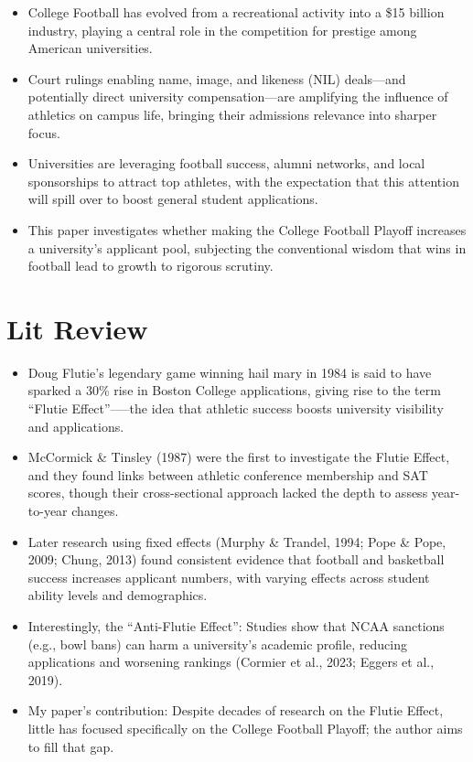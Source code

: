 \documentclass{article}
\begin{document}
\begin{itemize}
    \item College Football has evolved from a recreational activity into a \$15 billion industry, playing a central role in the competition for prestige among American universities.

    \item Court rulings enabling name, image, and likeness (NIL) deals---and potentially direct university compensation---are amplifying the influence of athletics on campus life, bringing their admissions relevance into sharper focus.

    \item Universities are leveraging football success, alumni networks, and local sponsorships to attract top athletes, with the expectation that this attention will spill over to boost general student applications.

    \item This paper investigates whether making the College Football Playoff increases a university's applicant pool, subjecting the conventional wisdom that wins in football lead to growth to rigorous scrutiny.
\end{itemize}

\section{Lit Review}

\begin{itemize}

    \item Doug Flutie’s legendary game winning hail mary in 1984 is said to have sparked a 30\% rise in Boston College applications, giving rise to the term “Flutie Effect”—--the idea that athletic success boosts university visibility and applications.

    \item  McCormick & Tinsley (1987) were the first to investigate the Flutie Effect, and they found links between athletic conference membership and SAT scores, though their cross-sectional approach lacked the depth to assess year-to-year changes.

    \item Later research using fixed effects (Murphy & Trandel, 1994; Pope & Pope, 2009; Chung, 2013) found consistent evidence that football and basketball success increases applicant numbers, with varying effects across student ability levels and demographics.

    \item Interestingly, the “Anti-Flutie Effect”: Studies show that NCAA sanctions (e.g., bowl bans) can harm a university’s academic profile, reducing applications and worsening rankings (Cormier et al., 2023; Eggers et al., 2019).

    \item My paper’s contribution: Despite decades of research on the Flutie Effect, little has focused specifically on the College Football Playoff; the author aims to fill that gap.
    
\end{itemize}
\end{document}
